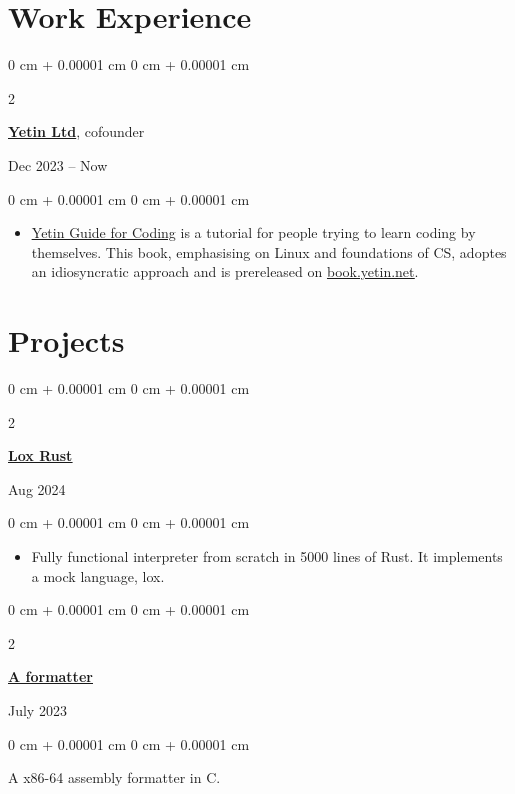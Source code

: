 \documentclass[10pt, a4paper]{article}
\newenvironment{highlights}{
    \begin{itemize}[
        topsep=0.10 cm,
        parsep=0.10 cm,
        partopsep=0pt,
        itemsep=0pt,
        leftmargin=0 cm + 10pt
    ]
}{
    \end{itemize}
} %
\newenvironment{onecolentry}{
    \begin{adjustwidth}{
        0 cm + 0.00001 cm
    }{
        0 cm + 0.00001 cm
    }
}{
    \end{adjustwidth}
} %
\newenvironment{twocolentry}[2][]{
    \onecolentry
    \def\secondColumn{#2}
    \setcolumnwidth{\fill, 4.5 cm}
    \begin{paracol}{2}
}{
    \switchcolumn \raggedleft \secondColumn
    \end{paracol}
    \endonecolentry
} %
\begin{document}
    
    \section{Work Experience}

        \begin{twocolentry}{
            Dec 2023 – Now
        }
			\href{https://yetin.net}{\textbf{\underline{Yetin Ltd}}}, cofounder
		\end{twocolentry}
        \vspace{0.10 cm}
        \begin{onecolentry}
            \begin{highlights}
				\item \href{https://book.yetin.net}{\underline{Yetin Guide for Coding}} is
					a tutorial for people trying to learn coding by themselves. 
					This book, emphasising on Linux and foundations of CS, adoptes an idiosyncratic approach and is prereleased on \href{https://book.yetin.net}{\underline{book.yetin.net}}.
            \end{highlights}
        \end{onecolentry}
    
    \section{Projects}

        \begin{twocolentry}{
            Aug 2024
		}
		\href{https://github.com/harryhanYuhao/lox-rust.git}{\underline{\textbf{Lox Rust}}}
		\end{twocolentry}
        \vspace{0.10 cm}
        \begin{onecolentry}
            \begin{highlights}
                \item Fully functional interpreter from scratch in 5000 lines of Rust.
				It implements a mock language, lox.
            \end{highlights}
        \end{onecolentry}

        \vspace{0.15 cm}

        \begin{twocolentry}{
				July 2023
        }
		\href{https://github.com/harryhanYuhao/aformatter}{\underline{\textbf{A formatter}}}
		\end{twocolentry}
        \vspace{0.10 cm}
        \begin{onecolentry}
			A x86-64 assembly formatter in C.
        \end{onecolentry}
\end{document}
